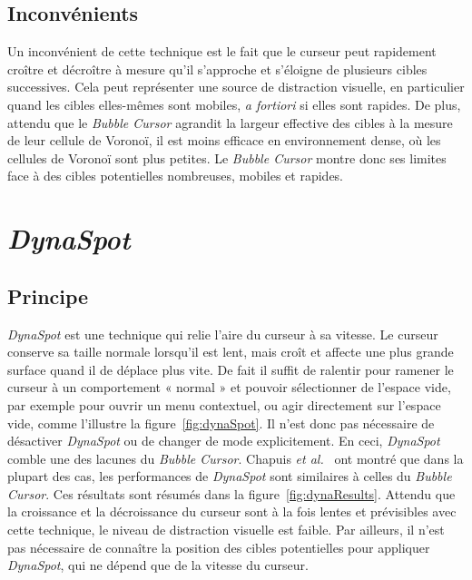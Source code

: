 	\subsection{Inconvénients}
	Un inconvénient de cette technique est le fait que le curseur peut rapidement croître et décroître à mesure qu'il s'approche et s'éloigne de plusieurs cibles successives. Cela peut représenter une source de distraction visuelle, en particulier quand les cibles elles-mêmes sont mobiles, \emph{a fortiori} si elles sont rapides. De plus, attendu que le \emph{Bubble Cursor} agrandit la largeur effective des cibles à la mesure de leur cellule de Voronoï, il est moins efficace en environnement dense, où les cellules de Voronoï sont plus petites. Le \emph{Bubble Cursor} montre donc ses limites face à des cibles potentielles nombreuses, mobiles et rapides.

\section{\emph{DynaSpot}}
	\subsection{Principe}
	\emph{DynaSpot} est une technique qui relie l'aire du curseur à sa vitesse. Le curseur conserve sa taille normale lorsqu'il est lent, mais croît et affecte une plus grande surface quand il de déplace plus vite. De fait il suffit de ralentir pour ramener le curseur à un comportement « normal » et pouvoir sélectionner de l'espace vide, par exemple pour ouvrir un menu contextuel, ou agir directement sur l'espace vide, comme l'illustre la figure~\ref{fig:dynaSpot}. Il n'est donc pas nécessaire de désactiver \emph{DynaSpot} ou de changer de mode explicitement. En ceci, \emph{DynaSpot} comble une des lacunes du \emph{Bubble Cursor}. Chapuis \emph{et al.}~\cite{chapuis2009dynaspot} ont montré que dans la plupart des cas, les performances de \emph{DynaSpot} sont similaires à celles du \emph{Bubble Cursor}. Ces résultats sont résumés dans la figure~\ref{fig:dynaResults}. Attendu que la croissance et la décroissance du curseur sont à la fois lentes et prévisibles avec cette technique, le niveau de distraction visuelle est faible. Par ailleurs, il n'est pas nécessaire de connaître la position des cibles potentielles pour appliquer \emph{DynaSpot}, qui ne dépend que de la vitesse du curseur.

